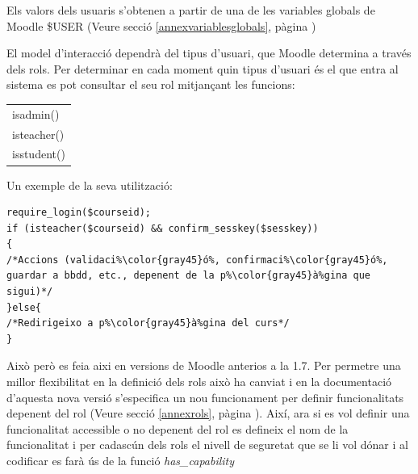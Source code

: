 \documentclass[a4paper]{report}  %
\begin{document}
Els valors dels usuaris s'obtenen a partir de una de les variables globals de Moodle \$USER (Veure secció \ref{annexvariablesglobals}, pàgina \pageref{annexvariablesglobals} )

El model d'interacció dependrà del tipus d'usuari, que Moodle determina a través dels rols. Per determinar en cada moment quin tipus d'usuari és el  que entra al 	sistema es pot consultar el seu rol mitjançant les funcions:
\begin{center}
   \begin{tabular}{l}
		isadmin()\\
		isteacher()\\
		isstudent()\\
   \end{tabular}
\end{center}
Un exemple de la seva utilització:
\begin{lstlisting}[style=PHP, caption=Exemple de comprovació de rol d'usuari en versions de Moodle anteriors a la 1.7,escapechar=\%]
require_login($courseid);
if (isteacher($courseid) && confirm_sesskey($sesskey))
{ 
/*Accions (validaci%\color{gray45}ó%, confirmaci%\color{gray45}ó%, guardar a bbdd, etc., depenent de la p%\color{gray45}à%gina que sigui)*/
}else{
/*Redirigeixo a p%\color{gray45}à%gina del curs*/
}  
\end{lstlisting}

Això però es feia aixi en versions de Moodle anterios a la 1.7. Per permetre una millor flexibilitat en la definició dels rols això ha canviat i en la documentació d'aquesta nova versió s'especifica un nou funcionament per definir funcionalitats depenent del rol (Veure secció \ref{annexrols}, pàgina \pageref{annexrols} ). Així, ara si es vol definir una funcionalitat accessible o no depenent del rol es defineix el nom de la funcionalitat i per cadascún dels rols el nivell de seguretat que se li vol dónar i al codificar es farà ús de la funció \textsl{has\_capability}
\end{document}
